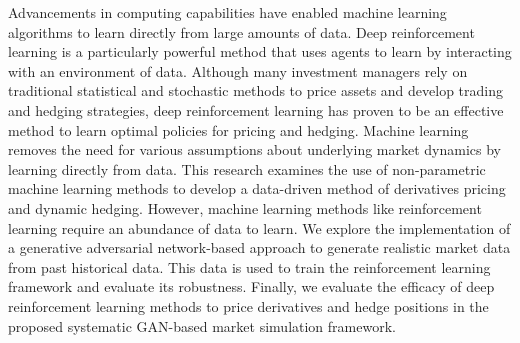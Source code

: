 % 
% 
%
Advancements in computing capabilities have enabled machine learning algorithms to learn directly from large amounts of data. Deep reinforcement learning is a particularly powerful method that uses agents to learn by interacting with an environment of data. Although many investment managers rely on traditional statistical and stochastic methods to price assets and develop trading and hedging strategies, deep reinforcement learning has proven to be an effective method to learn optimal policies for pricing and hedging. Machine learning removes the need for various assumptions about underlying market dynamics by learning directly from data. This research examines the use of non-parametric machine learning methods to develop a data-driven method of derivatives pricing and dynamic hedging. However, machine learning methods like reinforcement learning require an abundance of data to learn. We explore the implementation of a generative adversarial network-based approach to generate realistic market data from past historical data. This data is used to train the reinforcement learning framework and evaluate its robustness. Finally, we evaluate the efficacy of deep reinforcement learning methods to price derivatives and hedge positions in the proposed systematic GAN-based market simulation framework.